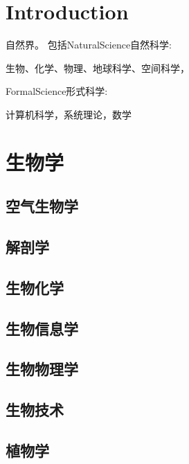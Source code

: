 

\chapter{Introduction}

自然界。
包括NaturalScience自然科学:

生物、化学、物理、地球科学、空间科学，


FormalScience形式科学:

计算机科学，系统理论，数学




\chapter{生物学}    %


\section{空气生物学}
\section{解剖学}
\section{生物化学}
\section{生物信息学}
\section{生物物理学}
\section{生物技术}
\section{植物学}
